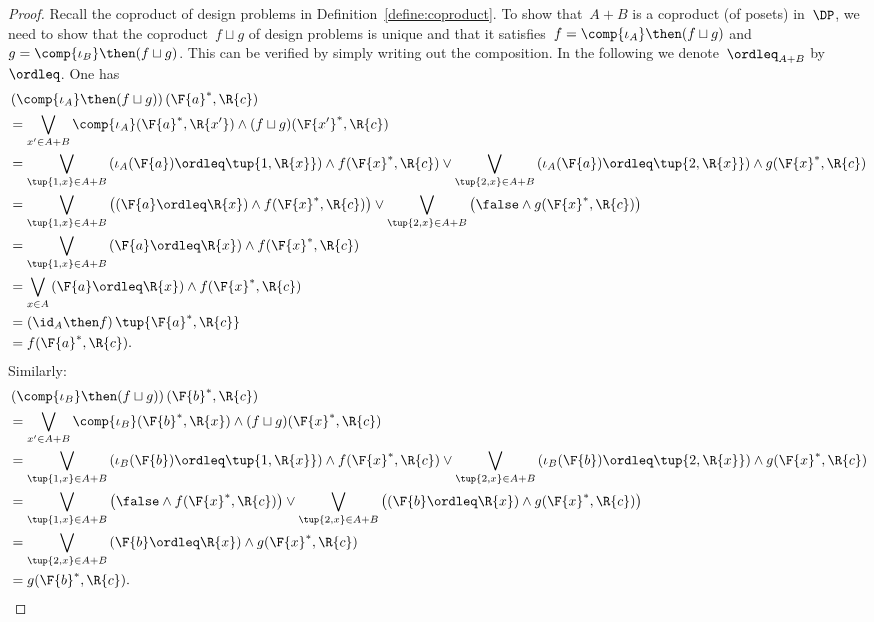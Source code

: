 \begin{proof}
  Recall the coproduct of design problems in Definition~\ref{define:coproduct}. To show that~$A+B$ is a coproduct (of posets) in~$\DP$, we need to show that the coproduct~$f \sqcup g$ of design problems is unique and that it satisfies~$f = \comp{\iota_A} \then (f \sqcup g)$ and~$g = \comp{\iota_B} \then (f \sqcup g)$. This can be verified by simply writing out the composition. In the following we denote~$\ordleq_{A+B}$ by $\ordleq$. One has
  \begin{equation}
    \begin{aligned}
      &\left(\comp{\iota_A}\then (f\sqcup g)\right)(\F{a}^*,\R{c})\\&=\bigvee_{x' \in A+B}\comp{\iota_A}(\F{a}^*,\R{x'})\wedge (f\sqcup g)(\F{x'}^*,\R{c})\\
      &=\bigvee_{\tup{1,x} \in A+B}
      \left(\iota_A(\F{a})\ordleq\tup{1,\R{x}}\right)\wedge  f(\F{x}^*,\R{c})  \vee \bigvee_{\tup{2,x} \in A+B}
      \left(\iota_A(\F{a})\ordleq \tup{2,\R{x}}\right)\wedge  g(\F{x}^*,\R{c})\\
      &=\bigvee_{\tup{1,x} \in A+B}
      \left( \left(\F{a}\ordleq \R{x}\right) \wedge  f(\F{x}^*,\R{c})\right) \vee \bigvee_{\tup{2,x} \in A+B}
      \left( \false \wedge  g(\F{x}^*,\R{c}) \right)\\
      &=\bigvee_{\tup{1,x} \in A+B} \left(\F{a}\ordleq \R{x}\right) \wedge  f(\F{x}^*,\R{c})\\
      &=\bigvee_{x\in A}\left( \F{a}\ordleq \R{x}\right) \wedge f(\F{x}^*,\R{c})\\
      &=\left( \id_A \then f\right)\tup{\F{a}^*,\R{c}}\\
      &=f(\F{a}^*,\R{c}).
    \end{aligned}
  \end{equation}
  Similarly:
  \begin{equation}
    \begin{aligned}
      &\left(\comp{\iota_B}\then (f\sqcup g)\right)(\F{b}^*,\R{c})\\&=\bigvee_{x' \in A+B}\comp{\iota_B}(\F{b}^*,\R{x})\wedge (f\sqcup g)(\F{x}^*,\R{c})\\
      &=\bigvee_{\tup{1,x} \in A+B}
      \left(\iota_B(\F{b})\ordleq\tup{1,\R{x}}\right)\wedge  f(\F{x}^*,\R{c})  \vee \bigvee_{\tup{2,x} \in A+B}
      \left(\iota_B(\F{b})\ordleq \tup{2,\R{x}}\right)\wedge  g(\F{x}^*,\R{c})\\
      &=\bigvee_{\tup{1,x} \in A+B}
      \left(\false \wedge  f(\F{x}^*,\R{c})\right) \vee \bigvee_{\tup{2,x} \in A+B}
      \left(\left(\F{b}\ordleq \R{x}\right) \wedge  g(\F{x}^*,\R{c}) \right)\\
      &=\bigvee_{\tup{2,x} \in A+B} \left(\F{b}\ordleq \R{x}\right) \wedge  g(\F{x}^*,\R{c})\\
      &=g(\F{b}^*,\R{c}).
    \end{aligned}
  \end{equation}


\end{proof}
